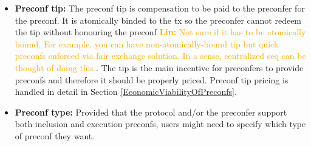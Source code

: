 \documentclass[a4paper]{article}
\theoremstyle{boldstyle}
\newcommand{\cm}[1]{\textcolor{blue}{\textbf{Conor:} #1}}
\newcommand{\qb}[1]{\textcolor{red}{\textbf{Quentin:} #1}}
\newcommand{\lo}[1]{\textcolor{orange}{\textbf{Lin:} #1}}
\begin{document}
\begin{itemize}
        \item \textbf{Preconf tip:} The preconf tip is compensation to be paid to the preconfer for the preconf. It is atomically binded to the tx so the preconfer cannot redeem the tip without honouring the preconf \lo{Not sure if it has to be atomically bound. For example, you can have non-atomically-bound tip but quick preconfs enforced via fair exchange solution. In a sense, centralized seq can be thought of doing this.}. The tip is the main incentive for preconfers to provide preconfs and therefore it should be properly priced. Preconf tip pricing is handled in detail in Section \ref{EconomicViabilityOfPreconfs}.
        
        \item \textbf{Preconf type:} 
        Provided that the protocol and/or the preconfer support both inclusion and execution preconfs, users might need to specify which type of preconf they want.
    \end{itemize}
\end{document}
